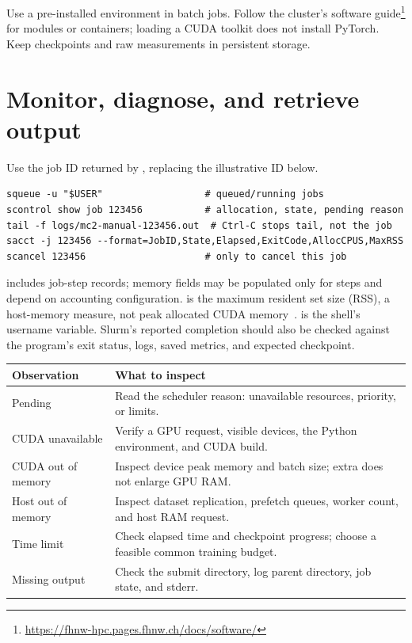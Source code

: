 \documentclass[11pt,a4paper,oneside]{report}
\newcommand{\code}[1]{\texttt{\detokenize{#1}}}
\begin{document}
Use a pre-installed environment in batch jobs. Follow the cluster's software
guide\footnote{\url{https://fhnw-hpc.pages.fhnw.ch/docs/software/}} for modules or containers; loading a CUDA toolkit does not install
PyTorch. Keep checkpoints and raw measurements in persistent storage.

\newpage
\section{Monitor, diagnose, and retrieve output}
Use the job ID returned by \code{sbatch}, replacing the illustrative ID below.
\begin{lstlisting}[style=shell]
squeue -u "$USER"                  # queued/running jobs
scontrol show job 123456           # allocation, state, pending reason
tail -f logs/mc2-manual-123456.out  # Ctrl-C stops tail, not the job
sacct -j 123456 --format=JobID,State,Elapsed,ExitCode,AllocCPUS,MaxRSS
scancel 123456                     # only to cancel this job
\end{lstlisting}
\code{sacct} includes job-step records; memory fields may be populated only
for steps and depend on accounting configuration. \code{MaxRSS} is the maximum
resident set size (RSS), a host-memory measure, not peak allocated CUDA
memory~\cite{sacct}. \code{USER} is the shell's username variable. Slurm's
reported completion should also be checked against the program's exit status,
logs, saved metrics, and expected checkpoint.

\begin{tabularx}{\textwidth}{@{}lY@{}}
\toprule
Observation & What to inspect\\\midrule
Pending & Read the scheduler reason: unavailable resources, priority, or limits.\\
CUDA unavailable & Verify a GPU request, visible devices, the Python environment, and CUDA build.\\
CUDA out of memory & Inspect device peak memory and batch size; extra \code{--mem} does not enlarge GPU RAM.\\
Host out of memory & Inspect dataset replication, prefetch queues, worker count, and host RAM request.\\
Time limit & Check elapsed time and checkpoint progress; choose a feasible common training budget.\\
Missing output & Check the submit directory, log parent directory, job state, and stderr.\\
\bottomrule
\end{tabularx}
\end{document}
